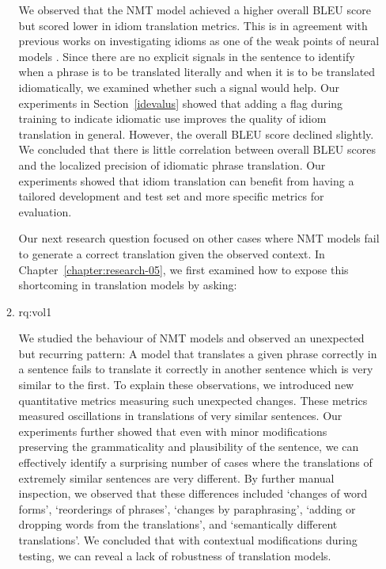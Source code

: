 \begin{enumerate}[label=\textbf{Research Question \arabic*:},ref={RQ\arabic*},wide = 0pt]
\begin{enumerate}[label=\textbf{RQ3.\arabic* },wide = 0pt, leftmargin=2em]
\noindent We observed that the NMT model achieved a higher overall BLEU score but scored lower in idiom translation metrics.
This is in agreement with previous works on investigating idioms as one of the weak points of neural models \citep{shao-etal-2018-evaluating}.
Since there are no explicit signals in the sentence to identify when a phrase is to be translated literally and when it is to be translated idiomatically, we examined whether such a signal would help. 
Our experiments in Section~\ref{idevalus} showed that adding a flag during training to indicate idiomatic use improves the quality of idiom translation in general.
However, the overall BLEU score declined slightly.
We concluded that there is little correlation between overall BLEU scores and the localized precision of idiomatic phrase translation.
Our experiments showed that idiom translation can benefit from having a tailored development and test set and more specific metrics for evaluation. 


\noindent Our next research question focused on other cases where NMT models fail to generate a correct translation given the observed context. 
In Chapter~\ref{chapter:research-05}, we first examined how to expose this shortcoming in translation models by asking:  

\item \acl{rq:vol1} \label{rq:vol1}

\medskip

\noindent We studied the behaviour of NMT models and observed an unexpected but recurring pattern: A model that translates a given phrase correctly in a sentence fails to translate it correctly in another sentence which is very similar to the first.
To explain these observations, we introduced new quantitative metrics measuring such unexpected changes. 
These metrics measured oscillations in translations of very similar sentences.  
Our experiments further showed that even with minor modifications preserving the grammaticality and plausibility of the sentence, we can effectively identify a surprising number of cases where the translations of extremely similar sentences are very different. 
By further manual inspection, we observed that these differences included `changes of word forms', `reorderings of phrases', `changes by paraphrasing', `adding or dropping words from the translations', and `semantically different translations'. 
We concluded that with contextual modifications during testing, we can reveal a lack of robustness of translation models.

\medskip


\end{enumerate}
\end{enumerate}

